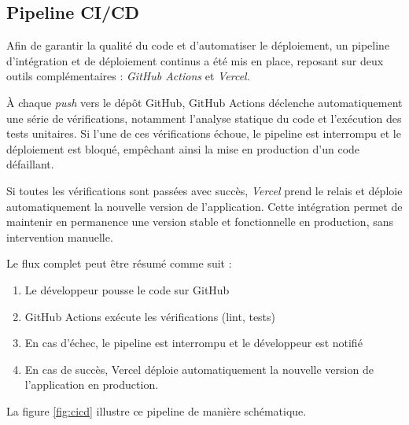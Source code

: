 \documentclass{article}
\begin{document}
\subsection{Pipeline CI/CD}

Afin de garantir la qualité du code et d'automatiser le déploiement, 
un pipeline d'intégration et de déploiement continus a été mis en place, 
reposant sur deux outils complémentaires : \textit{GitHub Actions} et 
\textit{Vercel}.

À chaque \textit{push} vers le dépôt GitHub, GitHub Actions déclenche 
automatiquement une série de vérifications, notamment l'analyse statique 
du code et l'exécution des tests unitaires. Si l'une de ces vérifications 
échoue, le pipeline est interrompu et le déploiement est bloqué, empêchant 
ainsi la mise en production d'un code défaillant.

Si toutes les vérifications sont passées avec succès, \textit{Vercel} 
prend le relais et déploie automatiquement la nouvelle version de 
l'application. Cette intégration permet de maintenir en permanence une 
version stable et fonctionnelle en production, sans intervention manuelle.

Le flux complet peut être résumé comme suit :

\begin{enumerate}
    \item Le développeur pousse le code sur GitHub
    \item GitHub Actions exécute les vérifications (lint, tests)
    \item En cas d'échec, le pipeline est interrompu et le développeur 
    est notifié
    \item En cas de succès, Vercel déploie automatiquement 
    la nouvelle version de l'application en production.
\end{enumerate}

La figure \ref{fig:cicd} illustre ce pipeline de manière schématique.
\end{document}
